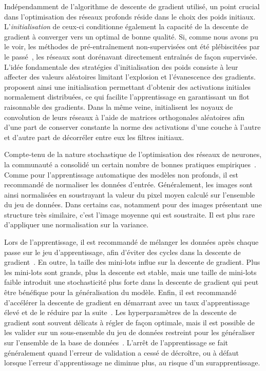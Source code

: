 Indépendamment de l'algorithme de descente de gradient utilisé, un point crucial dans l'optimisation des réseaux profonds réside dans le choix des poids initiaux. L'\emph{initialisation} de ceux-ci conditionne également la capacité de la descente de gradient à converger vers un optimal de bonne qualité. Si, comme nous avons pu le voir, les méthodes de pré-entraînement non-supervisées ont été plébiscitées par le passé~\cite{hinton_fast_2006,bengio_greedy_2007}, les réseaux sont dorénavant directement entraînés de façon supervisée. L'idée fondamentale des stratégies d'initialisation des poids consiste à leur affecter des valeurs aléatoires limitant l'explosion et l'évanescence des gradients. \citet{glorot_understanding_2010,he_delving_2015} proposent ainsi une initialisation permettant d'obtenir des activations initiales normalement distribuées, ce qui facilite l'apprentissage en garantissant un flot raisonnable des gradients. Dans la même veine, \citet{saxe_exact_2013} initialisent les noyaux de convolution de leurs réseaux à l'aide de matrices orthogonales aléatoires afin d'une part de conserver constante la norme des activations d'une couche à l'autre et d'autre part de décorréler entre eux les filtres initiaux.

Compte-tenu de la nature stochastique de l'optimisation des réseaux de neurones, la communauté a consolidé un certain nombre de bonnes pratiques empiriques~\cite{lecun_efficient_1998,bengio_practical_2012,bottou_stochastic_2012}. Comme pour l'apprentissage automatique des modèles non profonds, il est recommandé de normaliser les données d'entrée. Généralement, les images sont ainsi normalisées en soustrayant la valeur du pixel moyen calculé sur l'ensemble du jeu de données. Dans certains cas, notamment pour des images présentant une structure très similaire, c'est l'image moyenne qui est soustraite. Il est plus rare d'appliquer une normalisation sur la variance.

Lors de l'apprentissage, il est recommandé de mélanger les données après chaque passe sur le jeu d'apprentissage, afin d'éviter des cycles dans la descente de gradient~\cite{lecun_efficient_1998}. En outre, la taille des mini-lots influe sur la descente de gradient. Plus les mini-lots sont grands, plus la descente est stable, mais une taille de mini-lots faible introduit une stochasticité plus forte dans la descente de gradient qui peut être bénéfique pour la généralisation du modèle. Enfin, il est recommandé d'accélérer la descente de gradient en démarrant avec un taux d'apprentissage élevé et de le réduire par la suite~\cite{bengio_practical_2012}. Les hyperparamètres de la descente de gradient sont souvent délicats à régler de façon optimale, mais il est possible de les valider sur un sous-ensemble du jeu de données restreint pour les généraliser sur l'ensemble de la base de données~\cite{bottou_stochastic_2012}. L'arrêt de l'apprentissage se fait généralement quand l'erreur de validation a cessé de décroître, ou à défaut lorsque l'erreur d'apprentissage ne diminue plus, au risque d'un surapprentissage.

